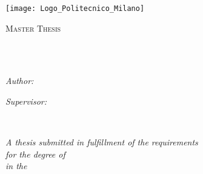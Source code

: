 \documentclass[
11pt, %
oneside, %
english, %
singlespacing, %
toctotoc, %
headsepline, %
]{MastersDoctoralThesis} %
\author{Daniele \textsc{Fornaro}} %
\begin{document}
	
	\frontmatter %
	
	\pagestyle{plain} %
	
	
	\begin{titlepage}
		\begin{center}
			\texttt{[image: Logo\_Politecnico\_Milano]} %
			\\
			\vspace*{.03\textheight}
			{\scshape\LARGE \univname\par}\vspace{1.5cm} %
			\textsc{\Large Master Thesis}\\[0.5cm] %
			
			\HRule \\[0.4cm] %
			{\huge \bfseries \ttitle\par}\vspace{0.4cm} %
			\HRule \\[1.5cm] %
			
			\begin{minipage}[t]{0.4\textwidth}
				\begin{flushleft} \large
					\emph{Author:}\\
					\href{http://www.johnsmith.com}{\authorname} %
				\end{flushleft}
			\end{minipage}
			\begin{minipage}[t]{0.4\textwidth}
				\begin{flushright} \large
					\emph{Supervisor:} \\
					\href{http://www.jamessmith.com}{\supname} %
				\end{flushright}
			\end{minipage}\\[3cm]
			
			\vfill
			
			\large \textit{A thesis submitted in fulfillment of the requirements\\ for the degree of \degreename}\\[0.3cm] %
			\textit{in the}\\[0.4cm]
			\facname\\\deptname\\[2cm] %
			

\end{center}
\end{titlepage}
\end{document}
